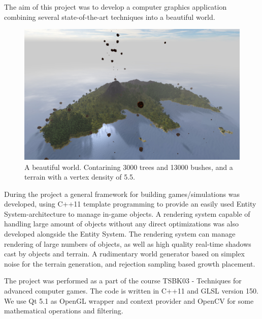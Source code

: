 The aim of this project was to develop a computer graphics application combining several state-of-the-art techniques into a beautiful world.
\begin{figure}[H]
  \centering
  \includegraphics[width=1.0\linewidth]{images/frontImage.jpg}
  \caption[A beautiful world.]{A beautiful world. Contarining 3000 trees and 13000 bushes, and a terrain with a vertex density of 5.5.}
  \label{fig:beautifulIsland}
\end{figure}%

During the project a general framework for building games/simulations was developed, using C++11 template programming to provide an easily used Entity System-architecture to manage in-game objects. A rendering system capable of handling large amount of objects without any direct optimizations was also developed alongside the Entity System. The rendering system can manage rendering of large numbers of objects, as well as high quality real-time shadows cast by objects and terrain. A rudimentary world generator based on simplex noise for the terrain generation, and rejection sampling based growth placement.


The project was performed as a part of the course TSBK03 - Techniques for advanced computer games. The code is written in C++11 and GLSL version 150. We use Qt 5.1 as OpenGL wrapper and context provider and OpenCV for some mathematical operations and filtering.